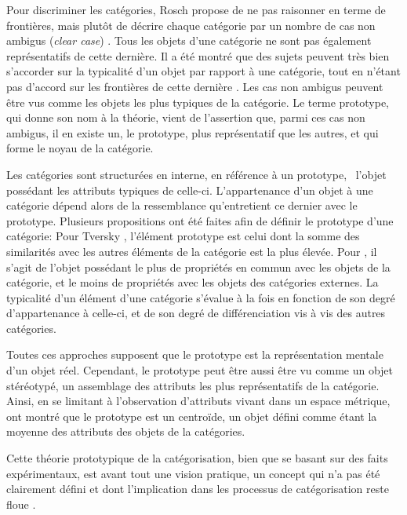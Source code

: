 Pour discriminer les catégories, Rosch propose de ne pas raisonner en terme de frontières, mais plutôt de décrire chaque catégorie par un nombre de cas non ambigus (\emph{clear case}) \citep[p. 36]{rosch1978cognition}. Tous les objets d'une catégorie ne sont pas également représentatifs de cette dernière. Il a été montré que des sujets peuvent très bien s'accorder sur la typicalité d'un objet par rapport à une catégorie, tout en n'étant pas d'accord sur les frontières de cette dernière \citep{rosch1974human,rosch1975cognitive}. Les cas non ambigus peuvent être vus comme les objets les plus typiques de la catégorie. Le terme prototype, qui donne son nom à la théorie, vient de l'assertion que, parmi ces cas non ambigus, il en existe un, le prototype, plus représentatif que les autres, et qui forme le noyau de la catégorie.

Les catégories sont structurées en interne, en référence à un prototype, \ie~l'objet possédant les attributs typiques de celle-ci. L'appartenance d'un objet à une catégorie dépend alors de la ressemblance qu'entretient ce dernier avec le prototype.  Plusieurs propositions ont été faites afin de définir le prototype d'une catégorie: Pour Tversky \citep{tversky1977features}, l'élément prototype est celui dont la somme des similarités avec les autres éléments de la catégorie est la plus élevée. Pour \citep{rosch1975family}, il s'agit de l'objet possédant le plus de propriétés en commun avec les objets de la catégorie, et le moins de propriétés avec les objets des catégories externes. La typicalité d'un élément d'une catégorie s'évalue à la fois en fonction de son degré d'appartenance à celle-ci, et de son degré de différenciation vis à vis des autres catégories. 

Toutes ces approches supposent que le prototype est la représentation mentale d'un objet réel. Cependant, le prototype peut être aussi être vu comme un objet stéréotypé, un assemblage des attributs les plus représentatifs de la catégorie. Ainsi, en se limitant à l'observation d'attributs vivant dans un espace métrique, \citep{reed1972pattern, rosch1976structural} ont montré que le prototype est un centroïde, un objet défini comme étant la moyenne des attributs des objets de la catégories.

Cette théorie prototypique de la catégorisation, bien que se basant sur des faits expérimentaux, est avant tout une vision pratique, un concept qui n'a pas été clairement défini et dont l'implication dans les processus de catégorisation reste floue \citep[p. 36-40]{rosch1978cognition} \citep[p. 49-54]{dubois1991semantique}.

